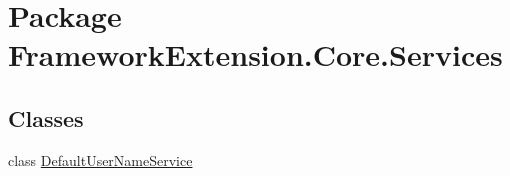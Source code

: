 \hypertarget{namespace_framework_extension_1_1_core_1_1_services}{\section{Package Framework\-Extension.\-Core.\-Services}
\label{namespace_framework_extension_1_1_core_1_1_services}
}
\subsection*{Classes}
\begin{DoxyCompactItemize}
\item 
class \hyperlink{class_framework_extension_1_1_core_1_1_services_1_1_default_user_name_service}{Default\-User\-Name\-Service}
\end{DoxyCompactItemize}

